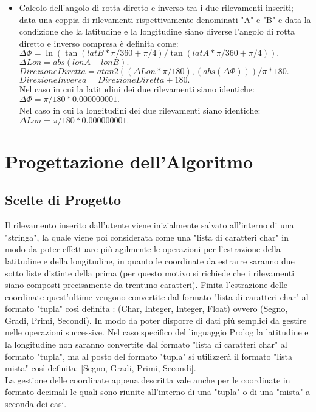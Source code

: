\documentclass{article}
\begin{document}
\begin{itemize}
	\item Calcolo dell'angolo di rotta diretto e inverso tra i due rilevamenti inseriti; data una coppia di rilevamenti rispettivamente denominati "A" e "B" e data la condizione che la latitudine e la longitudine siano diverse l'angolo di rotta diretto e inverso compresa è definita come: \\
	$\Delta\Phi = \ln( \tan(latB * \pi / 360 + \pi / 4 ) / \tan(latA * \pi / 360 + \pi / 4 )). $\\
	$ \Delta Lon = abs(lonA - lonB). $ \\
	$ Direzione Diretta = atan2((\Delta Lon * \pi / 180), (abs(\Delta\Phi))) / \pi * 180.$\\
	$ Direzione Inversa = Direzione Diretta + 180.$\\
	Nel caso in cui la latitudini dei due rilevamenti siano identiche:\\
	$\Delta\Phi = \pi / 180 * 0.000000001.$\\
	Nel caso in cui la longitudini dei due rilevamenti siano identiche:\\
	$\Delta Lon = \pi / 180 * 0.000000001.$\\
\end{itemize}
\newpage

\section{Progettazione dell'Algoritmo}
\subsection{Scelte di Progetto}
Il rilevamento inserito dall'utente viene inizialmente salvato all'interno di una "stringa", la quale viene poi considerata come una "lista di caratteri char" in modo da poter effettuare più agilmente le operazioni per l'estrazione della latitudine e della longitudine, in quanto le coordinate da estrarre saranno due sotto liste distinte della prima (per questo motivo si richiede che i rilevamenti siano composti precisamente da trentuno caratteri). Finita l'estrazione delle coordinate quest'ultime vengono convertite dal formato  "lista di caratteri char" al formato  "tupla" così definita : (Char, Integer, Integer, Float) ovvero (Segno, Gradi, Primi, Secondi). In modo da poter disporre di dati più semplici da gestire nelle operazioni successive.
Nel caso specifico del linguaggio Prolog la latitudine e la longitudine non saranno convertite dal formato "lista di caratteri char" al formato "tupla", ma al posto del formato "tupla" si utilizzerà il formato "lista mista" così definita: [Segno, Gradi, Primi, Secondi].\\
La gestione delle coordinate appena descritta vale anche per le coordinate in formato decimali le quali sono riunite all'interno di una "tupla" o di una "mista" a seconda dei casi.
\end{document}
